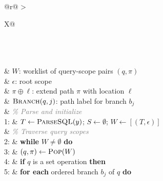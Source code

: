 \begin{algorithm}[t]
\captionsetup{
    font=footnotesize,
    labelfont=bf,
    textfont=normalfont
}
\caption{Commitment Extraction}
\label{alg:commitment-extraction}
\small
\renewcommand{\arraystretch}{1.08}

\begin{tabularx}{\linewidth}{
    @{}r@{\hspace{0.75em}}
    >{\raggedright\arraybackslash}X@{}
}

 \\

 \\[2pt]

 \\[-1pt]

&
$W$: worklist of query-scope pairs $(q,\pi)$
\\

&
$\epsilon$: root scope
\\

&
$\pi\oplus\ell$: extend path $\pi$ with location $\ell$
\\

&
$\textsc{Branch}(q,j)$: path label for branch $b_j$
\\[2pt]

&
\textcolor{gray}{\itshape\% Parse and initialize}
\\[-1pt]

1: &
$T\gets\textsc{ParseSQL}(y)$;
$S\gets\emptyset$;
$W\gets[(T,\epsilon)]$
\\[2pt]

&
\textcolor{gray}{\itshape\% Traverse query scopes}
\\[-1pt]

2: &
\textbf{while} $W\neq\emptyset$ \textbf{do}
\\

3: &
\hspace*{1.2em}
$(q,\pi)\gets\textsc{Pop}(W)$
\\

4: &
\hspace*{1.2em}
\textbf{if} $q$ is a set operation \textbf{then}
\\

5: &
\hspace*{2.4em}
\textbf{for each} ordered branch $b_j$ of $q$ \textbf{do}
\\


\end{tabularx}
\end{algorithm}
